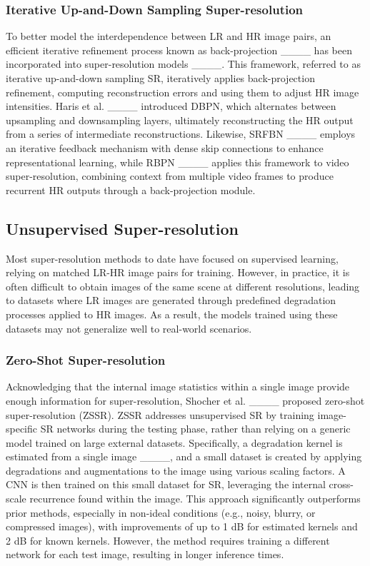 \subsubsection{Iterative Up-and-Down Sampling Super-resolution}
To better model the interdependence between LR and HR image pairs, an efficient iterative refinement process known as back-projection ____ has been incorporated into super-resolution models ____. This framework, referred to as iterative up-and-down sampling SR, iteratively applies back-projection refinement, computing reconstruction errors and using them to adjust HR image intensities. Haris et al. ____ introduced DBPN, which alternates between upsampling and downsampling layers, ultimately reconstructing the HR output from a series of intermediate reconstructions. Likewise, SRFBN ____ employs an iterative feedback mechanism with dense skip connections to enhance representational learning, while RBPN ____ applies this framework to video super-resolution, combining context from multiple video frames to produce recurrent HR outputs through a back-projection module.

\subsection{Unsupervised Super-resolution}
Most super-resolution methods to date have focused on supervised learning, relying on matched LR-HR image pairs for training. However, in practice, it is often difficult to obtain images of the same scene at different resolutions, leading to datasets where LR images are generated through predefined degradation processes applied to HR images. As a result, the models trained using these datasets may not generalize well to real-world scenarios.

\subsubsection{Zero-Shot Super-resolution}
Acknowledging that the internal image statistics within a single image provide enough information for super-resolution, Shocher et al. ____ proposed zero-shot super-resolution (ZSSR). ZSSR addresses unsupervised SR by training image-specific SR networks during the testing phase, rather than relying on a generic model trained on large external datasets. Specifically, a degradation kernel is estimated from a single image ____, and a small dataset is created by applying degradations and augmentations to the image using various scaling factors. A CNN is then trained on this small dataset for SR, leveraging the internal cross-scale recurrence found within the image. This approach significantly outperforms prior methods, especially in non-ideal conditions (e.g., noisy, blurry, or compressed images), with improvements of up to 1 dB for estimated kernels and 2 dB for known kernels. However, the method requires training a different network for each test image, resulting in longer inference times.

